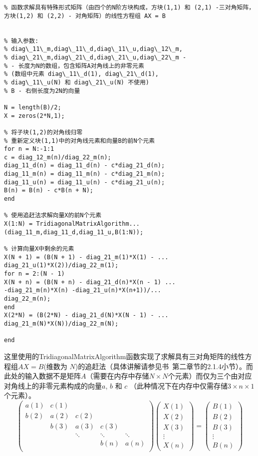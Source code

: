 \documentclass[twoside]{book}
\begin{document}
\begin{CJK*}{GBK}{song}
\begin{lstlisting}
% 函数求解具有特殊形式矩阵（由四个的N阶方块构成，方块(1,1) 和 (2,1) -三对角矩阵，方块(1,2) 和 (2,2) - 对角矩阵）的线性方程组 AX = B


% 输入参数:
% diag\_11\_m,diag\_11\_d,diag\_11\_u,diag\_12\_m,
% diag\_21\_m,diag\_21\_d,diag\_21\_u,diag\_22\_m -
% - 长度为N的数组，包含矩阵A对角线上的非零元素
% (数组中元素 diag\_11\_d(1), diag\_21\_d(1),
% diag\_11\_u(N) 和 diag\_21\_u(N) 不使用)
% B - 右侧长度为2N的向量

N = length(B)/2;
X = zeros(2*N,1);

% 将子块(1,2)的对角线归零
% 重新定义块(1,1)中的对角线元素和向量B的前N个元素
for n = N:-1:1
c = diag_12_m(n)/diag_22_m(n);
diag_11_d(n) = diag_11_d(n) - c*diag_21_d(n);
diag_11_m(n) = diag_11_m(n) - c*diag_21_m(n);
diag_11_u(n) = diag_11_u(n) - c*diag_21_u(n);
B(n) = B(n) - c*B(n + N);
end

% 使用追赶法求解向量X的前N个元素
X(1:N) = TridiagonalMatrixAlgorithm...
(diag_11_m,diag_11_d,diag_11_u,B(1:N));

% 计算向量X中剩余的元素
X(N + 1) = (B(N + 1) - diag_21_m(1)*X(1) - ...
diag_21_u(1)*X(2))/diag_22_m(1);
for n = 2:(N - 1)
X(N + n) = (B(N + n) - diag_21_d(n)*X(n - 1) ...
-diag_21_m(n)*X(n) -diag_21_u(n)*X(n+1))/...
diag_22_m(n);
end
X(2*N) = (B(2*N) - diag_21_d(N)*X(N - 1) - ...
diag_21_m(N)*X(N))/diag_22_m(N);

end
\end{lstlisting}

这里使用的TridiagonalMatrixAlgorithm函数实现了求解具有三对角矩阵的线性方程组$AX = B$(维数为 $N$)的追赶法（具体讲解请参见书~\cite{Kalitkin_book_1}第二章节的2.1.4小节）。而此处的输入数据不是矩阵$A$（需要在内存中存储$N \times N$个元素）而仅为三个由对应对角线上的非零元素构成的向量$a$, $b$ 和 $c$ （此种情况下在内存中仅需存储$3 \times n \times 1$个元素）。
\begin{equation*}
\begin{pmatrix}
a(1) &c(1) \\
b(2) &a(2) &c(2) \\
&b(3) &a(3) &c(3) \\
&     &\ddots &\ddots &\ddots \\
&       &       &b(n) &a(n) \\
\end{pmatrix}
\begin{pmatrix}
X(1) \\
X(2) \\
X(3) \\
\vdots \\
X(n)
\end{pmatrix}
=
\begin{pmatrix}
B(1) \\
B(2) \\
B(3) \\
\vdots \\
B(n)
\end{pmatrix}
\end{equation*}



\end{CJK*}
\end{document}
